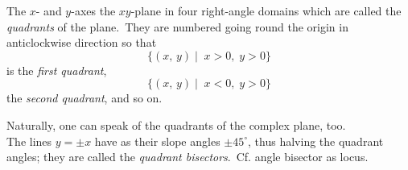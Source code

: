 \documentclass[12pt]{article}
\begin{document}
The $x$- and $y$-axes  the $xy$-plane in four right-angle domains which are called the {\em quadrants} of the plane. \,They are numbered going round the origin in anticlockwise direction so  that
$$\{(x,\,y) \mid \;  x > 0,\; y > 0\}$$
is the {\em first quadrant}, 
$$\{(x,\,y) \mid \;  x < 0,\; y > 0\}$$
the {\em second quadrant}, and so on. 

Naturally, one can speak of the quadrants of the complex plane, too.\\

The lines $y = \pm x$ have as their slope angles $\pm 45^\circ$,  
thus halving the quadrant angles; they are called the 
{\it quadrant bisectors}.\, Cf. angle bisector as locus.




\end{document}
